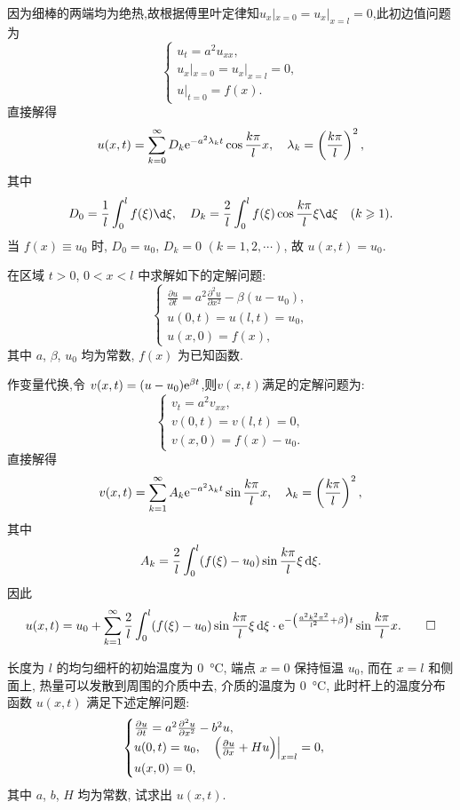 \begin{solution}
  因为细棒的两端均为绝热,故根据傅里叶定律知$u_x|_{x=0}=u_x|_{x=l}=0$,此初边值问题为
  \[\begin{cases}
    u_t = a^2u_{xx}, \\
    u_x|_{x=0} = u_x|_{x=l} = 0, \\
    u|_{t=0} = f(x).
  \end{cases}\]
  直接解得
  \[ u(x,t)=\sum_{k=0}^{\infty}D_k\mathrm{e}^{-a^2\lambda_kt}\cos\frac{k\pi}{l}x,
    \quad \lambda_k=\left(\frac{k\pi}{l}\right)^2, \]
  其中
  \[ D_0 = \frac{1}{l}\int_0^lf(\xi) \d\xi,
    \quad D_k=\frac{2}{l}\int_0^lf(\xi)\cos\frac{k\pi}{l}\xi \d\xi
    \quad (k\geq1).\]
  当 $f(x)\equiv u_0$ 时, $D_0=u_0$, $D_k=0$ $(k=1,2,\cdots)$, 故 $ u(x,t)=u_0$.
\end{solution}


\begin{exercise}
  在区域 $t>0$, $0<x<l$ 中求解如下的定解问题:
  \[\begin{cases}
    \displaystyle\frac{\partial u}{\partial t} = a^2 \frac{\partial^2u}{\partial x^2} - \beta(u-u_0), \\
    u(0,t) = u(l,t) = u_0, \\
    u(x,0) = f(x),
  \end{cases}\]
  其中 $a$, $\beta$, $u_0$ 均为常数, $f(x)$ 为已知函数.
\end{exercise}

\begin{solution}
  作变量代换,令 $v(x,t)=(u-u_0)\mathrm{e}^{\beta t}$,则$v(x,t)$满足的定解问题为:
  \[\begin{cases}
    v_t=a^2v_{xx}, \\
    v(0,t)=v(l,t)=0, \\
    v(x,0)=f(x)-u_0.
  \end{cases}\]
  直接解得
  \[ v(x,t) = \sum_{k=1}^{\infty}A_k\mathrm{e}^{-a^2\lambda_kt}\sin\frac{k\pi}{l}x,
    \quad \lambda_k = \left(\frac{k\pi}{l}\right)^2, \]
  其中
  \[ A_k = \frac{2}{l}\int_0^l(f(\xi)-u_0)\sin\frac{k\pi}{l}\xi\mathop{}\!\mathrm{d}\xi. \]
  因此
  \[u(x,t) = u_0 + \sum_{k=1}^{\infty}\frac{2}{l}
    \int_0^l(f(\xi)-u_0)\sin\frac{k\pi}{l}\xi\mathop{}\!\mathrm{d}\xi
      \cdot \mathrm{e}^{-\left(\frac{a^2k^2\pi^2}{l^2}+\beta\right)t}\sin\frac{k\pi}{l}x. \qedhere \]
\end{solution}


\begin{exercise}
  长度为 $l$ 的均匀细杆的初始温度为 \qty{0}{\degreeCelsius}, 端点 $x=0$ 保持恒温 $u_0$,
  而在 $x=l$ 和侧面上, 热量可以发散到周围的介质中去, 介质的温度为 \qty{0}{\degreeCelsius},
  此时杆上的温度分布函数 $u(x,t)$ 满足下述定解问题:
  \[\begin{cases}
    \frac{\partial u}{\partial t} = a^2 \frac{\partial^2 u}{\partial x^2} - b^2 u, \\
    u(0,t) = u_0, \quad \Bigl(\frac{\partial u}{\partial x} + Hu\Bigr)\Big|_{x=l} = 0, \\
    u(x,0) = 0,
  \end{cases}\]
  其中 $a$, $b$, $H$ 均为常数, 试求出 $u(x,t)$.
\end{exercise}

